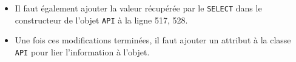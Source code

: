 \begin{enumerate}
\begin{itemize}
              \item Il faut également ajouter la valeur récupérée par le \texttt{SELECT} dans le constructeur de l'objet \texttt{API} à la ligne 517, 528.

              \item Une fois ces modifications terminées, il faut ajouter un attribut à la classe \texttt{API} pour lier l’information à l'objet.
          \end{itemize}
\end{enumerate}
